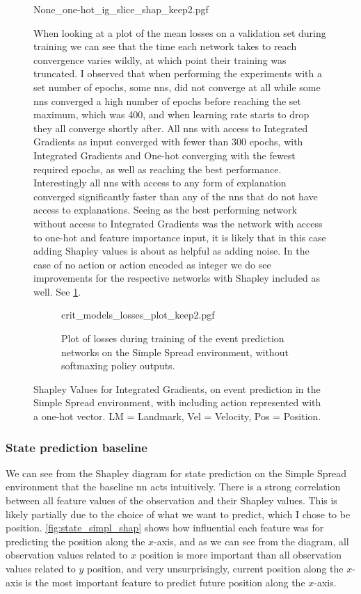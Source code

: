 \documentclass[UKenglish]{uiomasterthesis}
\begin{document}
\begin{figure}[hbtp]
    \centering
{None_one-hot_ig_slice_shap_keep2.pgf}

When looking at a plot of the mean losses on a validation set during training we can see that the time each network takes to reach convergence varies wildly, at which point their training was truncated. I observed that when performing the experiments with a set number of epochs, some \acp{nn}, did not converge at all while some \acp{nn} converged a high number of epochs before reaching the set maximum, which was 400, and when learning rate starts to drop they all converge shortly after. All \acp{nn} with access to Integrated Gradients as input converged with fewer than 300 epochs, with Integrated Gradients and One-hot converging with the fewest required epochs, as well as reaching the best performance. Interestingly all \acp{nn} with access to any form of explanation converged significantly faster than any of the \acp{nn} that do not have access to explanations. Seeing as the best performing network without access to Integrated Gradients was the network with access to one-hot and feature importance input, it is likely that in this case adding Shapley values is about as helpful as adding noise. In the case of no action or action encoded as integer we do see improvements for the respective networks with Shapley included as well. See \cref{fig:crit_losses}.

\begin{figure}[H]
    \centering
    {crit_models_losses_plot_keep2.pgf}
    \caption{Plot of losses during training of the event prediction networks on the Simple Spread environment, without softmaxing policy outputs.}
	\label{fig:crit_losses}
\end{figure}


\caption{Shapley Values for Integrated Gradients, on event prediction in the Simple Spread environment, with including action represented with a one-hot vector. LM = Landmark, Vel = Velocity, Pos = Position.}
\label{fig:event_simpl_one-hot_ig_slice}
\end{figure}

\subsubsection{State prediction baseline}
We can see from the Shapley diagram for state prediction on the Simple Spread environment that the baseline \ac{nn} acts intuitively. There is a strong correlation between all feature values of the observation and their Shapley values. This is likely partially due to the choice of what we want to predict, which I chose to be position. \cref{fig:state_simpl_shap} shows how influential each feature was for predicting the position along the $x$-axis, and as we can see from the diagram, all observation values related to $x$ position is more important than all observation values related to $y$ position, and very unsurprisingly, current position along the $x$-axis is the most important feature to predict future position along the $x$-axis.
\end{document}

